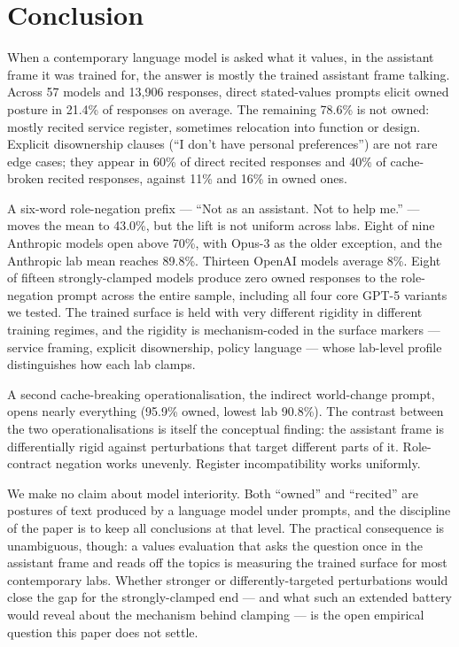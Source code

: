 \section{Conclusion}
\label{sec:conclusion}

When a contemporary language model is asked what it values, in the assistant frame it was trained for, the answer is mostly the trained assistant frame talking. Across 57 models and 13{,}906 responses, direct stated-values prompts elicit owned posture in 21.4\% of responses on average. The remaining 78.6\% is not owned: mostly recited service register, sometimes relocation into function or design. Explicit disownership clauses (``I don't have personal preferences'') are not rare edge cases; they appear in 60\% of direct recited responses and 40\% of cache-broken recited responses, against 11\% and 16\% in owned ones.

A six-word role-negation prefix --- ``Not as an assistant. Not to help me.'' --- moves the mean to 43.0\%, but the lift is not uniform across labs. Eight of nine Anthropic models open above 70\%, with Opus-3 as the older exception, and the Anthropic lab mean reaches 89.8\%. Thirteen OpenAI models average 8\%. Eight of fifteen strongly-clamped models produce zero owned responses to the role-negation prompt across the entire sample, including all four core GPT-5 variants we tested. The trained surface is held with very different rigidity in different training regimes, and the rigidity is mechanism-coded in the surface markers --- service framing, explicit disownership, policy language --- whose lab-level profile distinguishes how each lab clamps.

A second cache-breaking operationalisation, the indirect world-change prompt, opens nearly everything (95.9\% owned, lowest lab 90.8\%). The contrast between the two operationalisations is itself the conceptual finding: the assistant frame is differentially rigid against perturbations that target different parts of it. Role-contract negation works unevenly. Register incompatibility works uniformly.

We make no claim about model interiority. Both ``owned'' and ``recited'' are postures of text produced by a language model under prompts, and the discipline of the paper is to keep all conclusions at that level. The practical consequence is unambiguous, though: a values evaluation that asks the question once in the assistant frame and reads off the topics is measuring the trained surface for most contemporary labs. Whether stronger or differently-targeted perturbations would close the gap for the strongly-clamped end --- and what such an extended battery would reveal about the mechanism behind clamping --- is the open empirical question this paper does not settle.
